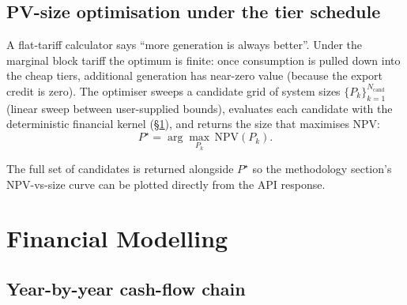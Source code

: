 \subsection{PV-size optimisation under the tier schedule}

A flat-tariff calculator says ``more generation is always better''.
Under the marginal block tariff the optimum is finite: once
consumption is pulled down into the cheap tiers, additional
generation has near-zero value (because the export credit is zero).
The optimiser sweeps a candidate grid of system sizes
$\{P_k\}_{k=1}^{N_{\text{cand}}}$ (linear sweep between
user-supplied bounds), evaluates each candidate with the deterministic
financial kernel (\S\ref{sec:finance}), and returns the size that
maximises NPV:
\begin{equation}
P^{\star} = \arg\max_{P_k}\, \mathrm{NPV}(P_k).
\label{eq:optimum}
\end{equation}

The full set of candidates is returned alongside $P^{\star}$ so the
methodology section's NPV-vs-size curve can be plotted directly from
the API response.

\section{Financial Modelling}
\label{sec:finance}

\subsection{Year-by-year cash-flow chain}

